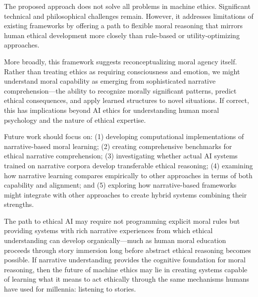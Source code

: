 \documentclass[12pt]{article}
\begin{document}
The proposed approach does not solve all problems in machine ethics. Significant technical and philosophical challenges remain. However, it addresses limitations of existing frameworks by offering a path to flexible moral reasoning that mirrors human ethical development more closely than rule-based or utility-optimizing approaches.

More broadly, this framework suggests reconceptualizing moral agency itself. Rather than treating ethics as requiring consciousness and emotion, we might understand moral capability as emerging from sophisticated narrative comprehension—the ability to recognize morally significant patterns, predict ethical consequences, and apply learned structures to novel situations. If correct, this has implications beyond AI ethics for understanding human moral psychology and the nature of ethical expertise.

Future work should focus on: (1) developing computational implementations of narrative-based moral learning; (2) creating comprehensive benchmarks for ethical narrative comprehension; (3) investigating whether actual AI systems trained on narrative corpora develop transferable ethical reasoning; (4) examining how narrative learning compares empirically to other approaches in terms of both capability and alignment; and (5) exploring how narrative-based frameworks might integrate with other approaches to create hybrid systems combining their strengths.

The path to ethical AI may require not programming explicit moral rules but providing systems with rich narrative experiences from which ethical understanding can develop organically—much as human moral education proceeds through story immersion long before abstract ethical reasoning becomes possible. If narrative understanding provides the cognitive foundation for moral reasoning, then the future of machine ethics may lie in creating systems capable of learning what it means to act ethically through the same mechanisms humans have used for millennia: listening to stories.
\end{document}
